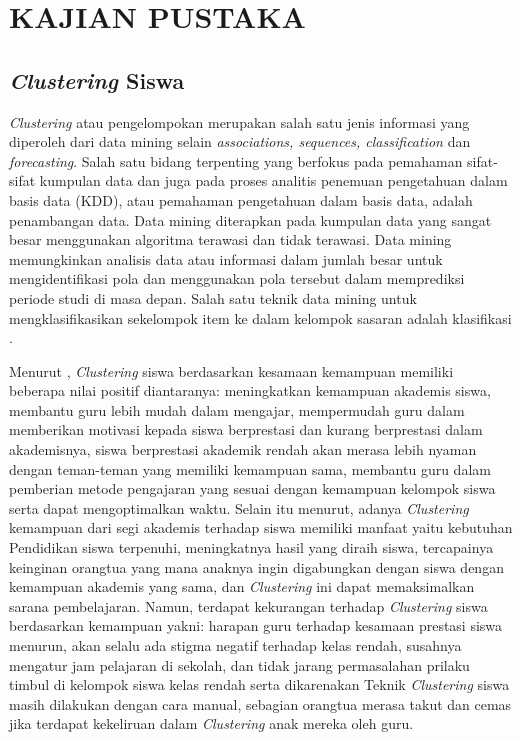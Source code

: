 \chapter{KAJIAN PUSTAKA}

\section{\textit{Clustering} Siswa}

\textit{Clustering} atau pengelompokan merupakan salah satu jenis informasi yang diperoleh dari data mining selain \textit{associations, sequences, classification} dan \textit{forecasting}. Salah satu bidang terpenting yang berfokus pada pemahaman sifat-sifat kumpulan data dan juga pada proses analitis penemuan pengetahuan dalam basis data (KDD), atau pemahaman pengetahuan dalam basis data, adalah penambangan data.  Data mining diterapkan pada kumpulan data yang sangat besar menggunakan algoritma terawasi dan tidak terawasi.  Data mining memungkinkan analisis data atau informasi dalam jumlah besar untuk mengidentifikasi pola dan menggunakan pola tersebut dalam memprediksi periode studi di masa depan.  Salah satu teknik data mining untuk mengklasifikasikan sekelompok item ke dalam kelompok sasaran adalah klasifikasi \citep{Oluwaseun2019}.

Menurut \citep{Adodo2011}, \textit{Clustering} siswa berdasarkan kesamaan kemampuan memiliki beberapa nilai positif diantaranya: meningkatkan kemampuan akademis siswa, membantu guru lebih mudah dalam mengajar, mempermudah guru dalam memberikan motivasi kepada siswa berprestasi dan kurang berprestasi dalam akademisnya, siswa berprestasi akademik rendah akan merasa lebih nyaman dengan teman-teman yang memiliki kemampuan sama, membantu guru dalam pemberian metode pengajaran yang sesuai dengan kemampuan kelompok siswa serta dapat mengoptimalkan waktu. Selain itu menurut, adanya \textit{Clustering} kemampuan dari segi akademis terhadap siswa memiliki manfaat yaitu kebutuhan Pendidikan siswa terpenuhi, meningkatnya hasil yang diraih siswa, tercapainya keinginan orangtua yang mana anaknya ingin digabungkan dengan siswa dengan kemampuan akademis yang sama, dan \textit{Clustering} ini dapat memaksimalkan sarana pembelajaran. Namun, terdapat kekurangan terhadap \textit{Clustering} siswa berdasarkan kemampuan yakni: harapan guru terhadap kesamaan prestasi siswa menurun, akan selalu ada stigma negatif terhadap kelas rendah, susahnya mengatur jam pelajaran di sekolah, dan tidak jarang permasalahan prilaku timbul di kelompok siswa kelas rendah serta dikarenakan Teknik \textit{Clustering} siswa masih dilakukan dengan cara manual, sebagian orangtua merasa takut dan cemas jika terdapat kekeliruan dalam \textit{Clustering} anak mereka oleh guru.

